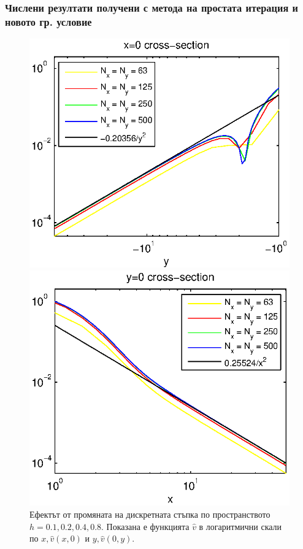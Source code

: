 \documentclass{beamer}
\begin{document}
\begin{frame}
\frametitle{Числени резултати получени с метода на простата итерация и новото гр. условие}
\begin{figure}[ht]
	\begin{minipage}[b]{0.45\linewidth}
		\raggedleft
		\includegraphics[width=\linewidth]{../Thesis/NewBoundaryCondition/crossSectionLogX=0.eps}
	\end{minipage}	
	\begin{minipage}[b]{0.45\linewidth}
		\raggedright
		 \includegraphics[width=\linewidth]{../Thesis/NewBoundaryCondition/crossSectionLogY=0.eps}
	\end{minipage}	
	\caption{Ефектът от промяната на дискретната стъпка по пространството $h=0.1, 0.2, 0.4, 0.8$. Показана е функцията $\widehat{v}$ в логаритмични скали по $x,\widehat v(x,0)$ и $y,\widehat v(0,y)$. }

\end{figure}
\end{frame}
\end{document}
